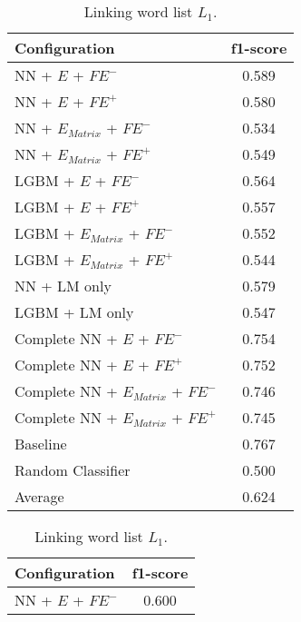 \begin{table}[h]
  	\tiny
  	\centering
	\begin{subtable}{.5\textwidth}
		\centering
  		\renewcommand{\arraystretch}{1.4}
   		\begin{tabular}{|| l || c ||}
   			\hline
   			{Configuration} & {f1-score} \\
   			\hline\hline
   			NN + $E$ + $\textit{FE}^-$ &  0.589 \\
 			\hline
 			NN + $E$ + $\textit{FE}^+$ & 0.580 \\
 			\hline
 			NN + $E_{Matrix}$ + $\textit{FE}^-$ & 0.534 \\
 			\hline
 			NN + $E_{Matrix}$ + $\textit{FE}^+$ & 0.549 \\
 			\hline
 			LGBM + $E$ + $\textit{FE}^-$ & 0.564 \\
 			\hline
 			LGBM + $E$ + $\textit{FE}^+$ & 0.557 \\
 			\hline
 			LGBM + $E_{Matrix}$ + $\textit{FE}^-$ & 0.552 \\
 			\hline
 			LGBM + $E_{Matrix}$ + $\textit{FE}^+$ & 0.544 \\
 			\hline
 			NN + LM only & 0.579 \\
 			\hline
 			LGBM + LM only & 0.547 \\
 			\hline
 			Complete NN + $E$ + $\textit{FE}^-$ & 0.754 \\
 			\hline
 			Complete NN + $E$ + $\textit{FE}^+$ & 0.752 \\
 			\hline
 			Complete NN + $E_{Matrix}$ + $\textit{FE}^-$ & 0.746 \\
 			\hline
 			Complete NN + $E_{Matrix}$ + $\textit{FE}^+$ & 0.745 \\
 			\hline
 			Baseline & 0.767 \\
 			\hline
 			Random Classifier & 0.500 \\
 			\hline
 			\hline
 			Average & 0.624 \\
 			\hline
		\end{tabular}
		\renewcommand{\arraystretch}{1}
  		\caption{Linking word list $L_1$.}%
  	\end{subtable}%
  	\begin{subtable}{.5\textwidth}
		\centering
  		\renewcommand{\arraystretch}{1.4}
   		\begin{tabular}{|| l || c ||}
   			\hline
   			{Configuration} & {f1-score} \\
   			\hline\hline
   			NN + $E$ + $\textit{FE}^-$ &  0.600 \\
 			\hline

\end{tabular}
\end{subtable}
\end{table}
